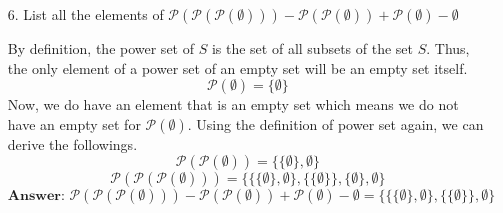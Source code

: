 \begin{enumerate}
    
    \item[6.]
    List all the elements of $\mathcal{P}(\mathcal{P}(\mathcal{P}(\emptyset))) - \mathcal{P}(\mathcal{P}(\emptyset)) + \mathcal{P}(\emptyset) - \emptyset$
    \begin{solutiondraft}
        By definition, the power set of $S$ is the set of all subsets of the set $S$. Thus, the only element of a power set of an empty set will be an empty set itself.
        $$\mathcal{P}(\emptyset) = \{\emptyset\}$$
        Now, we do have an element that is an empty set which means we do not have an empty set for $\mathcal{P}(\emptyset)$. Using the definition of power set again, we can derive the followings.
        $$\mathcal{P}(\mathcal{P}(\emptyset)) = \{\{\emptyset\},\emptyset\}$$
        $$\mathcal{P}(\mathcal{P}(\mathcal{P}(\emptyset))) = \{
            \{\{\emptyset\},\emptyset\},
            \{\{\emptyset\}\},
            \{\emptyset\},
            \emptyset
        \}$$
        $$\textbf{Answer: }\mathcal{P}(\mathcal{P}(\mathcal{P}(\emptyset))) - \mathcal{P}(\mathcal{P}(\emptyset)) + \mathcal{P}(\emptyset) - \emptyset = \{
            \{\{\emptyset\},\emptyset\},
            \{\{\emptyset\}\},
            \emptyset
        \}$$
    \end{solutiondraft}
    \begin{comment}
        here is where you type in your explain.
    \end{comment}


    
    
    
    
    \begin{comment}
        here is where you type in your explain.
    \end{comment}
\end{enumerate}